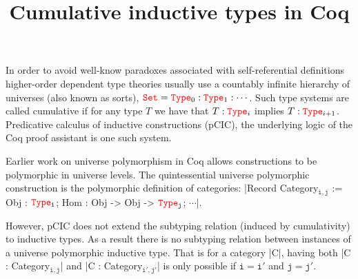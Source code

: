 \documentclass{easychair}
\title{Cumulative inductive types in Coq}
\author{
}
\institute{
 }
\newcommand{\Type}[1]{{\color{red} \mathtt{Type}}_{#1}}
\newcommand{\Set}{{\color{red} \mathtt{Set}}}
\begin{document}
\maketitle

In order to avoid well-know paradoxes associated with self-referential
definitions higher-order dependent type theories usually use a
countably infinite hierarchy of universes (also known as sorts),
$\Set = \Type{0} : \Type{1} : \cdots$. Such type systems are called
cumulative if for any type $T$ we have that $T : \Type{i}$ implies
$T : \Type{i+1}$. Predicative calculus of inductive constructions
(pCIC), the underlying logic of the Coq proof assistant is one such
system.

Earlier work \cite{DBLP:conf/itp/SozeauT14} on universe polymorphism
in Coq allows constructions to be polymorphic in universe levels.  The
quintessential universe polymorphic construction is the polymorphic definition of
categories:
\Coqe|Record Category$_{\mathtt{i, j}}$ := {Obj : $\Type{\mathtt{i}}$; Hom : Obj -> Obj -> $\Type{\mathtt{j}}$; $\cdots$}|.\footnotemark{}

However, pCIC does not extend the subtyping relation (induced by
cumulativity) to inductive types. As a result there is no subtyping
relation between instances of a universe polymorphic inductive type.
That is for a category \Coqe|C|, having both
\Coqe|C : Category$_{\mathtt{i, j}}$| and \Coqe|C : Category$_{\mathtt{i', j'}}$|
is only possible if $\mathtt{i = i'}$ and $\mathtt{j = j'}$.
\end{document}
